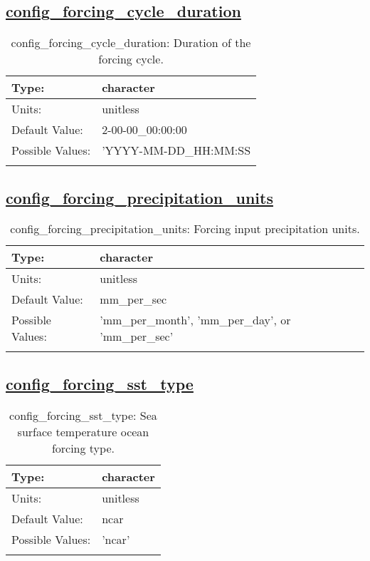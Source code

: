 \subsection[config\_forcing\_cycle\_duration]{\hyperref[sec:nm_tab_forcing]{config\_forcing\_cycle\_duration}}
\label{subsec:nm_sec_config_forcing_cycle_duration}
\begin{center}
\begin{longtable}{| p{2.0in} || p{4.0in} |}
    \hline
    Type: & character \\
    \hline
    Units: & \si{unitless} \\
    \hline
    Default Value: & 2-00-00\_00:00:00 \\
    \hline
    Possible Values: & 'YYYY-MM-DD\_HH:MM:SS \\
    \hline
    \caption{config\_forcing\_cycle\_duration: Duration of the forcing cycle.}
\end{longtable}
\end{center}
\subsection[config\_forcing\_precipitation\_units]{\hyperref[sec:nm_tab_forcing]{config\_forcing\_precipitation\_units}}
\label{subsec:nm_sec_config_forcing_precipitation_units}
\begin{center}
\begin{longtable}{| p{2.0in} || p{4.0in} |}
    \hline
    Type: & character \\
    \hline
    Units: & \si{unitless} \\
    \hline
    Default Value: & mm\_per\_sec \\
    \hline
    Possible Values: & 'mm\_per\_month', 'mm\_per\_day', or 'mm\_per\_sec' \\
    \hline
    \caption{config\_forcing\_precipitation\_units: Forcing input precipitation units.}
\end{longtable}
\end{center}
\subsection[config\_forcing\_sst\_type]{\hyperref[sec:nm_tab_forcing]{config\_forcing\_sst\_type}}
\label{subsec:nm_sec_config_forcing_sst_type}
\begin{center}
\begin{longtable}{| p{2.0in} || p{4.0in} |}
    \hline
    Type: & character \\
    \hline
    Units: & \si{unitless} \\
    \hline
    Default Value: & ncar \\
    \hline
    Possible Values: & 'ncar' \\
    \hline
    \caption{config\_forcing\_sst\_type: Sea surface temperature ocean forcing type.}
\end{longtable}
\end{center}
